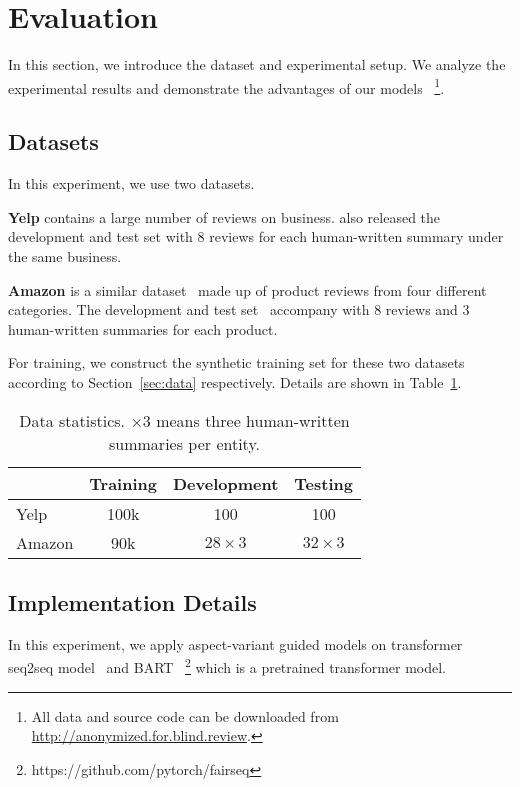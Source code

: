 \section{Evaluation}
\label{sec:eval}
In this section, we introduce the dataset and experimental setup.
We analyze the experimental results
and demonstrate the advantages of our models
~\footnote{All data and source code
can be downloaded from \url{http://anonymized.for.blind.review}.}.

\subsection{Datasets}
In this experiment, we use two datasets.


\textbf{Yelp} 
contains a large number of reviews on business.
\citet{MeanSum19} also released the development and test set with 8 reviews for each human-written summary under the same business.

\textbf{Amazon} 
is a similar dataset~\cite{HeM16} made up of product reviews from four different categories. %
The development and test set~\cite{Copycat20} accompany with 8 reviews and 3 human-written summaries for each product.

For training, we construct the synthetic training set for these two datasets according to Section~\ref{sec:data} respectively. Details are shown in Table~\ref{tab:datasets}.

\begin{table}[th]
	\small
	\centering
	\begin{tabular}{|l|c|c|c|}
		\hline
		\textbf{} & \textbf{Training} &\textbf{Development} & \textbf{Testing}\\
		\hline
		Yelp & 100k & 100 & 100 \\
		Amazon & 90k & $28\times3$ & $32\times3$ \\
		\hline
	\end{tabular}
	\caption{Data statistics. $\times3$ means three human-written  summaries per entity.}
	\label{tab:datasets}
\end{table}

\subsection{Implementation Details}
In this experiment,
we apply aspect-variant guided models on transformer seq2seq model~\cite{Transformer17}
and BART~\cite{BART20}
\footnote{https://github.com/pytorch/fairseq}
which is a pretrained transformer model.

